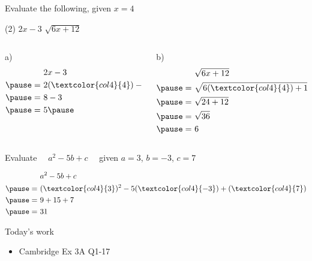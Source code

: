 \documentclass[aspectratio=1610,10pt]{beamer}
\begin{document}
\begin{frame}
  \begin{example}
    Evaluate the following, given $x=4$
    \begin{tasks}(2)
      \task $2x-3$
      \task $\sqrt{6x+12}$
    \end{tasks}
  \end{example}\pause
  \begin{solution}[]
    \vspace{-1em}
    \begin{columns}[t]
      \begin{column}{.4\textwidth}
    a) $ $\vspace{-1em}\[
      \begin{aligned}
         &2x-3\\\pause
      =\ &2(\textcolor{col4}{4})-3\\\pause
      =\ &8-3\\\pause
      =\ &5\pause
      \end{aligned}
      \]
    \end{column}
    \begin{column}{.4\textwidth}
    b) $ $\vspace{-1em}\[
      \begin{aligned}
         &\sqrt{6x+12}\\\pause
      =\ &\sqrt{6(\textcolor{col4}{4})+12}\\\pause
      =\ &\sqrt{24+12}\\\pause
      =\ &\sqrt{36}\\\pause
      =\ &6\\
      \end{aligned}
      \]
    \end{column}
  \end{columns}
  \end{solution}
\end{frame}

\begin{frame}
  \begin{example}
    Evaluate $\quad a^2-5b+c\quad$ given $a=3$, $b=-3$, $c=7$
  \end{example}\pause
  \begin{solution}[]
    \[
      \begin{aligned}
         &a^2-5b+c\\\pause
      =\ &(\textcolor{col4}{3})^2-5(\textcolor{col4}{-3})+(\textcolor{col4}{7})\\\pause
      =\ &9+15+7\\\pause
      =\ &31
      \end{aligned}
      \]
  \end{solution}
\end{frame}

\begin{frame}{Today's work}
  \begin{itemize} 
    \item Cambridge Ex 3A Q1-17
  \end{itemize}
\end{frame}
\end{document}
